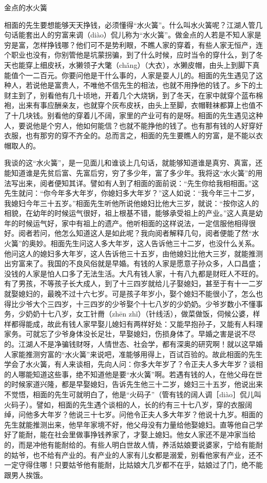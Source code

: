 \documentclass[12pt,UTF8]{ctexbook}
\begin{document}
金点的水火簧


相面的先生要想能够天天挣钱，必须懂得“水火簧”。什么叫水火簧呢？江湖人管几句话能套出人的穷富来调（diào）侃儿称为“水火簧”。做金点的人若是不知人家是穷是富，怎样挣钱哪？他们可不是势利眼，不瞧人家的穿着，有些人家无恒产，连个职业也没有，你别管他是坑蒙拐骗，到了什么时候，应时当令的穿什么，到了冬天也能穿上细皮袄，水獭领子大氅（chǎng）（大衣），水獭皮帽，由头上到脚下真能值个一二百元。你要问他是干什么事的，人家是耍人儿的。相面的先生遇见了这种人，若说他是富贵人，不唯他不信先生的相法，也就不用挣他的钱了。乡下的土财主到了，别看他有几十顷地，开着几个大烧锅，到了冬天，在家中就穿个蓝布棉袍，出来有事应酬亲友，也就穿个灰布皮袄，由头上至脚，衣帽鞋袜都算上也值不了十几块钱。别看他的穿着儿不阔，家里的产业可有的是呀。相面的先生遇见这种人，要说他是个穷人，他如何能信？也就不能挣他的钱了。也有那有钱的人好穿好衣服，也有那穷的穿不齐全的。总而言之，相面的先生要瞧人的穷富，是不能以衣帽取人的。

我谈的这“水火簧”，是一见面儿和谁谈上几句话，就能够知道谁是真穷、真富，还能知道谁是先贫后富、先富后穷，穷了多少年，富了多少年。我将这“水火簧”的用法写出来，阅者便知其详。譬如有人到了相面的面前说：“先生你给我相相面。”这先生就问：“你今年多大年岁，你媳妇多大年岁？”这人如说：“我今年三十二岁，我媳妇今年三十五岁。”相面先生听他所说他媳妇比他大三岁，就说：“按你这人的相貌，在幼年的时候运气很好，祖上根基不错，能够承受祖上的产业。”这人真是幼年的时候运气好，家中有祖上的遗产。他听相面的这样说法，一定信服他相得很好。阅者若问，他怎么知道这人是如此呢？我向阅者解释几句，阅者便能了然“水火簧”的奥妙。相面先生问这人多大年岁，这人告诉他三十二岁，也没什么关系。他问这人的媳妇多大年岁，这人告诉他三十五岁，由他媳妇比他大三岁，就能推测出穷富来了。我国的不良风俗就是早婚。有钱的人家是愿意子孙众多，人口昌盛；没钱的人家是怕人口多了无法生活。大凡有钱人家，十有八九都是财旺人不旺的。有了男孩，不等孩子长大成人，到了十三四岁就给儿子娶媳妇，甚至于有十一二岁就娶媳妇的，最晚不过十六七岁。可是孩子年岁小，娶个媳妇不能很小了，怎么也得比少爷大个三四岁，十三四岁的少爷娶个十七八岁的少奶奶。少爷岁数小不懂事务，少奶奶十七八岁，女工针黹（zhēn zhǐ）（针线活），做菜做饭，伺候公婆，样样都得能成，故此有钱人家早娶儿媳妇有两样好处：又能早抱孙子，又能有人料理家务。可就忘了少爷身体没长足壮，早娶媳妇，伤损身体了。早婚之害是说不尽的。江湖人不是净骗钱财呀，人情世态、社会学，都有深奥的研究啊！就以这早婚人家能推测穷富的“水火簧”来说吧，准能够用得上，百试百验的。故此相面的先生学会了水火簧，有人来谈相，先向人问：你多大年岁了？令正夫人多大年岁？谈相的人哪能知道这些事，绝不知道他是要“水火簧”啊。若遇有钱的人，在他父母在世的时候家道兴隆，都是早娶媳妇，告诉先生他三十二岁，媳妇三十五岁，他说出来不觉悟，相面的先生可就明白了，他是“火码子”（管有钱的阔人调［diào］侃儿叫火码子）。譬如，相面的先生遇个谈相的人，长的约有三十七八岁，穿的衣服阔绰，问他多大年岁？他说三十七岁。问他令正夫人多大年岁？他说十九岁。相面的先生就能推测出来，他早年家境不好，他父母没有力量给他娶媳妇。直等他自己学好了能耐，能在社会里做事挣钱养家了，才娶上媳妇。他女人家还不是冲家当给的，而是冲他有能耐给的。有些人明白世故人情，养活姑娘要说婆家，宁给有能耐的姑爷，也不给有产业的。有产业的人家有儿女都是溺爱，别看他家有产业，还不一定守得住哪！只要姑爷他有能耐，比姑娘大几岁都不在乎，姑娘过了门，绝不能跟男人挨饿。
\end{document}
